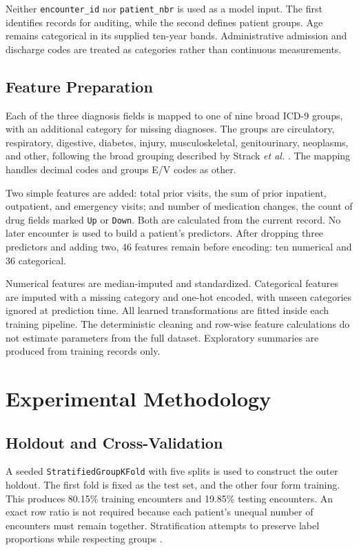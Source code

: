 \documentclass[conference]{IEEEtran}
\begin{document}
Neither \texttt{encounter\_id} nor \texttt{patient\_nbr} is used as a model input. The first identifies records for auditing, while the second defines patient groups. Age remains categorical in its supplied ten-year bands. Administrative admission and discharge codes are treated as categories rather than continuous measurements.

\subsection{Feature Preparation}
Each of the three diagnosis fields is mapped to one of nine broad ICD-9 groups, with an additional category for missing diagnoses. The groups are circulatory, respiratory, digestive, diabetes, injury, musculoskeletal, genitourinary, neoplasms, and other, following the broad grouping described by Strack \emph{et al.} \cite{strack}. The mapping handles decimal codes and groups E/V codes as other.

Two simple features are added: total prior visits, the sum of prior inpatient, outpatient, and emergency visits; and number of medication changes, the count of drug fields marked \texttt{Up} or \texttt{Down}. Both are calculated from the current record. No later encounter is used to build a patient's predictors. After dropping three predictors and adding two, 46 features remain before encoding: ten numerical and 36 categorical.

Numerical features are median-imputed and standardized. Categorical features are imputed with a missing category and one-hot encoded, with unseen categories ignored at prediction time. All learned transformations are fitted inside each training pipeline. The deterministic cleaning and row-wise feature calculations do not estimate parameters from the full dataset. Exploratory summaries are produced from training records only.

\FloatBarrier
\section{Experimental Methodology}
\subsection{Holdout and Cross-Validation}
A seeded \texttt{StratifiedGroupKFold} with five splits is used to construct the outer holdout. The first fold is fixed as the test set, and the other four form training. This produces 80.15\% training encounters and 19.85\% testing encounters. An exact row ratio is not required because each patient's unequal number of encounters must remain together. Stratification attempts to preserve label proportions while respecting groups \cite{groupcv}.
\end{document}
